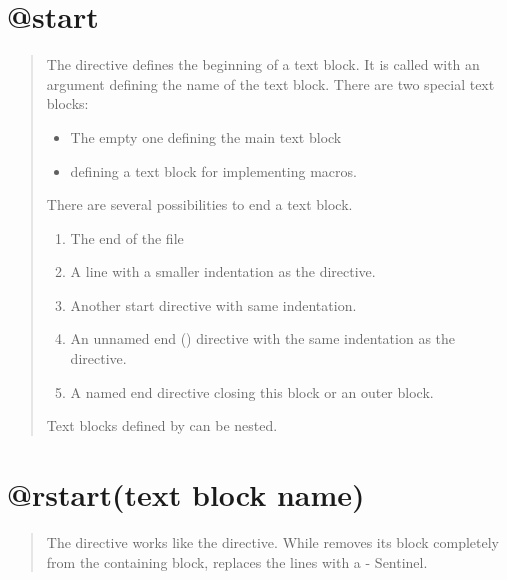 \documentclass[letterpaper,10pt,english]{sphinxmanual}
\begin{document}
\section{@start}
\label{getting_started:start}\begin{quote}

The  directive defines the beginning of
a text block. It is called with an argument defining
the name of the text block. There are two special text
blocks:
\begin{itemize}
\item {} 
\sphinxcode{()} The empty one defining the main text block

\item {} 
 defining a text block for implementing macros.

\end{itemize}

There are several possibilities to end a text block.
\begin{enumerate}
\item {} 
The end of the file

\item {} 
A line with a smaller indentation as the  directive.

\item {} 
Another start directive with same indentation.

\item {} 
An unnamed end () directive with the same indentation as
the  directive.

\item {} 
A named end directive closing this block or an outer block.

\end{enumerate}

Text blocks defined by  can be nested.
\end{quote}


\section{@rstart(text block name)}
\label{getting_started:rstart-text-block-name}\begin{quote}

The  directive works like the  directive. While  removes its block completely from the containing block,
 replaces the lines with a  - Sentinel.
\end{quote}
\end{document}
